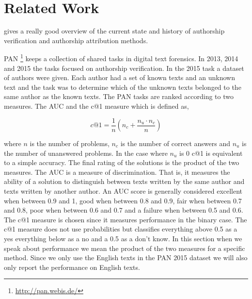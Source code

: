 \section{Related Work}
\cite{stamatos2009} gives a really good overview of the current state and
history of authorship verification and authorship attribution methods.

PAN \footnote{\url{http://pan.webis.de/}} keeps a collection of shared tasks in
digital text forensics. In 2013, 2014 and 2015 the tasks focused on authorship
verification. In the 2015 task a dataset of authors were given. Each author had
a set of known texts and an unknown text and the task was to determine which
of the unknown texts belonged to the same author as the known texts. The PAN
tasks are ranked according to two measures. The \gls{AUC} and the c@1 measure
\cite{penas2011} which is defined as,

\begin{equation}
    c@1 = \frac{1}{n} \left(n_c + \frac{n_u \cdot n_c}{n}\right)
\end{equation}

where $n$ is the number of problems, $n_c$ is the number of correct answers and
$n_u$ is the number of unanswered problems. In the case where $n_u$ is 0 c@1
is equivalent to a simple accuracy. The final rating of the solutions is the
product of the two measures. The AUC is a measure of discrimination. That is,
it measures the ability of a solution to distinguish between texts written by
the same author and texts written by another author. An AUC score is generally
considered excellent when between 0.9 and 1, good when between 0.8 and 0.9,
fair when between 0.7 and 0.8, poor when between 0.6 and 0.7 and a failure when
between 0.5 and 0.6. The c@1 measure is chosen since it measures performance
in the binary case. The c@1 measure does not use probabilities but classifies
everything above 0.5 as a yes everything below as a no and a 0.5 as a don't
know. In this section when we speak about performance we mean the product of the
two measures for a specific method. Since we only use the English texts in the
PAN 2015 dataset we will also only report the performance on English texts.

